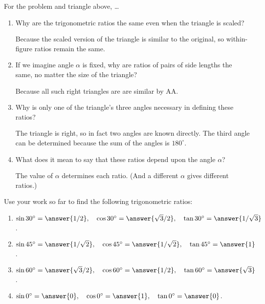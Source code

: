 \documentclass[nooutcomes]{ximera}
\begin{document}
\begin{problem}
For the problem and triangle above, \dots
\begin{enumerate}
\item Why are the trigonometric ratios the same even when the triangle is scaled? 
\begin{hint}
Because the scaled version of the triangle is similar to the original, so within-figure ratios remain the same. \end{hint}
\item If we imagine angle $\alpha$ is fixed, why are ratios of pairs of side lengths the same, no matter the size of the triangle?
  \begin{hint}Because all such right triangles are are similar by AA.  \end{hint}
\item Why is only one of the triangle's three angles necessary in defining these ratios?  
  \begin{hint}The triangle is right, so in fact two angles are known directly.  The third angle can be determined because the sum of the angles is $180^\circ$.\end{hint}  
\item What does it mean to say that these ratios depend upon the angle $\alpha$?  
  \begin{hint}The value of $\alpha$ determines each ratio.  (And a different $\alpha$ gives different ratios.)\end{hint}
\end{enumerate}
\begin{freeResponse}
\end{freeResponse}
\end{problem}

\begin{problem}
Use your work so far to find the following trigonometric ratios:
\begin{enumerate}
\item $\sin 30^\circ = \answer{1/2}, \quad \cos30^\circ = \answer{\sqrt{3}/2}, \quad \tan30^\circ = \answer{1/\sqrt{3}}$.
\item $\sin 45^\circ = \answer{1/\sqrt{2}}, \quad \cos45^\circ = \answer{1/\sqrt{2}}, \quad \tan45^\circ = \answer{1}$.
\item $\sin 60^\circ = \answer{\sqrt{3}/2}, \quad \cos60^\circ = \answer{1/2}, \quad \tan60^\circ = \answer{\sqrt{3}}$.
\item $\sin 0^\circ = \answer{0}, \quad \cos0^\circ = \answer{1}, \quad \tan0^\circ = \answer{0}$.
\end{enumerate}
\end{problem}
\end{document}
